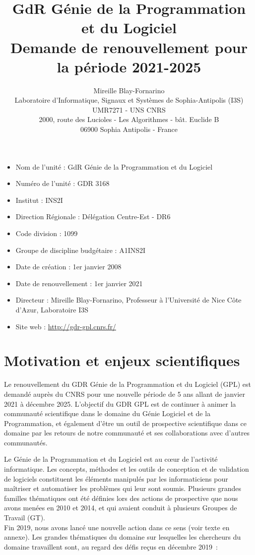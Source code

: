 \documentclass[11pt]{article}
\title{GdR Génie de la Programmation et du Logiciel\\ Demande de renouvellement pour la période 2021-2025}
\author{Mireille Blay-Fornarino\\
Laboratoire d'Informatique, Signaux et Systèmes de Sophia-Antipolis (I3S)\\ 
UMR7271 - UNS CNRS\\
2000, route des Lucioles - Les Algorithmes - bât. Euclide B\\
06900 Sophia Antipolis - France}
\begin{document}
\maketitle

\begin{itemize}
\item Nom de l'unité : GdR Génie de la Programmation et du Logiciel
\item Numéro de l'unité : GDR 3168
\item Institut : INS2I
\item Direction Régionale : Délégation Centre-Est - DR6
\item Code division : 1099
\item Groupe de discipline budgétaire : A1INS2I
\item Date de création : 1er janvier 2008
\item Date de renouvellement : 1er janvier 2021
\item Directeur : Mireille Blay-Fornarino, Professeur à l'Université de Nice Côte d'Azur, Laboratoire I3S
\item Site web : \url{http://gdr-gpl.cnrs.fr/}
\end{itemize}

\section{Motivation et enjeux scientifiques}

Le renouvellement du GDR Génie de la Programmation et du Logiciel (GPL) est
demandé auprès du CNRS pour une nouvelle période de 5 ans allant de janvier
2021 à décembre 2025.
L'objectif du GDR GPL est de continuer à animer la communauté scientifique dans
le domaine du Génie Logiciel et de la Programmation, et également d'être un outil de prospective scientifique dans ce domaine par les retours de notre communauté et ses collaborations avec d'autres communautés.






Le Génie de la Programmation et du Logiciel est au c{\oe}ur de l'activité
informatique. Les concepts, méthodes et les outils de conception et de
validation de logiciels constituent les éléments manipulés par les
informaticiens pour maîtriser et automatiser les problèmes qui leur sont
soumis. 
Plusieurs grandes familles thématiques ont été définies lors des actions de prospective que nous avons menées en 2010 et 2014, et qui avaient conduit à plusieurs Groupes de Travail (GT). \\
Fin 2019, nous avons lancé une nouvelle action dans ce sens (voir texte en annexe). %
Les grandes thématiques du domaine sur lesquelles les chercheurs du
domaine travaillent sont, au regard des défis reçus en décembre 2019~: 
\end{document}
